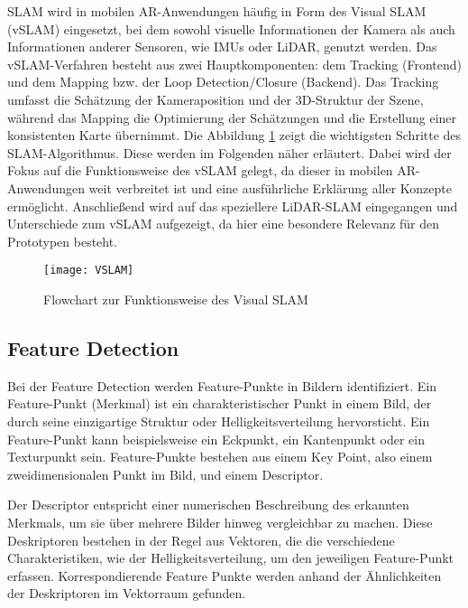 SLAM wird in mobilen AR-Anwendungen häufig in Form des Visual SLAM (vSLAM) eingesetzt, bei dem sowohl visuelle Informationen der Kamera als auch Informationen anderer Sensoren, wie IMUs oder LiDAR, genutzt werden. Das vSLAM-Verfahren besteht aus zwei Hauptkomponenten: dem Tracking (Frontend) und dem Mapping bzw. der Loop Detection/Closure (Backend). Das Tracking umfasst die Schätzung der Kameraposition und der 3D-Struktur der Szene, während das Mapping die Optimierung der Schätzungen und die Erstellung einer konsistenten Karte übernimmt. Die Abbildung \ref{fig:VSLAM} zeigt die wichtigsten Schritte des SLAM-Algorithmus. Diese werden im Folgenden näher erläutert. Dabei wird der Fokus auf die Funktionsweise des vSLAM gelegt, da dieser in mobilen AR-Anwendungen weit verbreitet ist und eine ausführliche Erklärung aller Konzepte ermöglicht. Anschließend wird auf das speziellere LiDAR-SLAM eingegangen und Unterschiede zum vSLAM aufgezeigt, da hier eine besondere Relevanz für den Prototypen besteht. \cite{gao2021vSLAM, tourani2022vSLAMTrends, doerner2022virtual}

\begin{figure}
    \centering
    \texttt{[image: VSLAM]}
    \caption{Flowchart zur Funktionsweise des Visual SLAM \cite{tourani2022vSLAMTrends}\label{fig:VSLAM}}\par
\end{figure}

\subsection{Feature Detection}

Bei der Feature Detection werden Feature-Punkte in Bildern identifiziert. Ein Feature-Punkt (Merkmal) ist ein charakteristischer Punkt in einem Bild, der durch seine einzigartige Struktur oder Helligkeitsverteilung hervorsticht. Ein Feature-Punkt kann beispielsweise ein Eckpunkt, ein Kantenpunkt oder ein Texturpunkt sein. Feature-Punkte bestehen aus einem Key Point, also einem zweidimensionalen Punkt im Bild, und einem Descriptor. \cite{gao2021vSLAM, szeliski2022computerVision}

Der Descriptor entspricht einer numerischen Beschreibung des erkannten Merkmals, um sie über mehrere Bilder hinweg vergleichbar zu machen. Diese Deskriptoren bestehen in der Regel aus Vektoren, die die verschiedene Charakteristiken, wie der Helligkeitsverteilung, um den jeweiligen Feature-Punkt erfassen. Korrespondierende Feature Punkte werden anhand der Ähnlichkeiten der Deskriptoren im Vektorraum gefunden. \cite{gao2021vSLAM, szeliski2022computerVision}

